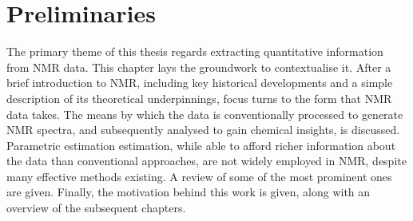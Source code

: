 \chapter{Preliminaries}
\label{chap:intro}
The primary theme of this thesis regards extracting quantitative information
from \ac{NMR} data. This chapter lays the groundwork to contextualise it. After
a brief introduction to \ac{NMR}, including key historical developments and a
simple description of its theoretical underpinnings, focus turns to
the form that \ac{NMR} data takes. The means by which the data is
conventionally processed to generate \ac{NMR} spectra, and subsequently
analysed to gain chemical insights, is discussed. Parametric estimation
estimation, while able to afford richer information about the data than
conventional approaches, are not widely employed in \ac{NMR}, despite many
effective methods existing. A review of some of the most prominent ones are
given. Finally, the motivation behind this work is given, along with an
overview of the subsequent chapters.




